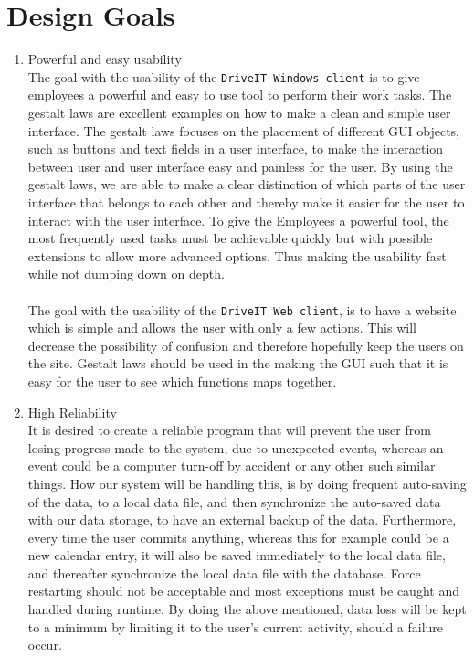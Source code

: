 \section{Design Goals}
\begin{enumerate}
\item Powerful and easy usability\\
The goal with the usability of the \texttt{DriveIT Windows client} is to give employees a powerful and easy to use tool to perform their work tasks. The gestalt laws are excellent examples on how to make a clean and simple user interface. The gestalt laws focuses on the placement of different GUI objects, such as buttons and text fields in a user interface, to make the interaction between user and user interface easy and painless for the user. By using the gestalt laws, we are able to make a clear distinction of which parts of the user interface that belongs to each other and thereby make it easier for the user to interact with the user interface. To give the Employees a powerful tool, the most frequently used tasks must be achievable quickly but with possible extensions to allow more advanced options. Thus making the usability fast while not dumping down on depth.\\\\
The goal with the usability of the \texttt{DriveIT Web client}, is to have a website which is simple and allows the user with only a few actions. This will decrease the possibility of confusion and therefore hopefully keep the users on the site. Gestalt laws should be used in the making the GUI such that it is easy for the user to see which functions maps together.

\item High Reliability\\
It is desired to create a reliable program that will prevent the user from losing progress made to the system, due to unexpected events, whereas an event could be a computer turn-off by accident or any other such similar things. How our system will be handling this, is by doing frequent auto-saving of the data, to a local data file, and then synchronize the auto-saved data with our data storage, to have an external backup of the data. Furthermore, every time the user commits anything, whereas this for example could be a new calendar entry, it will also be saved immediately to the local data file, and thereafter synchronize the local data file with the database. Force restarting should not be acceptable and most exceptions must be caught and handled during runtime. By doing the above mentioned, data loss will be kept to a minimum by limiting it to the user's current activity, should a failure occur.\\


\end{enumerate}
